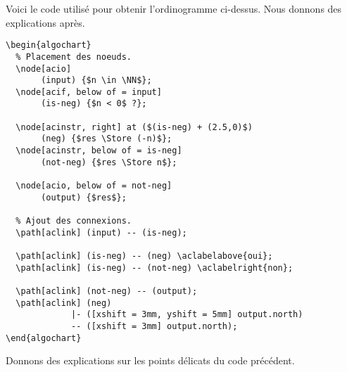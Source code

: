 \documentclass[12pt,a4paper]{article}
\theoremstyle{definition}
\newenvironment{frame-gene}[1][]{
	\begin{tcolorbox}[
		title        = #1, 
		colbacktitle = black!10!white, 
		colback      = white, 
		coltitle     = black,
		fonttitle    = \bfseries\itshape\small, 
		breakable,
		center title]
}{
	\end{tcolorbox}
}
\begin{document}
\begin{center}
    \small
    
\end{center}


Voici le code utilisé pour obtenir l'ordinogramme ci-dessus. Nous donnons des explications après.

\medskip

\begin{frame-gene}
\begin{verbatim}
\begin{algochart}
  % Placement des noeuds.
  \node[acio]
       (input) {$n \in \NN$};
  \node[acif, below of = input]
       (is-neg) {$n < 0$ ?};

  \node[acinstr, right] at ($(is-neg) + (2.5,0)$)
       (neg) {$res \Store (-n)$};
  \node[acinstr, below of = is-neg]
       (not-neg) {$res \Store n$};

  \node[acio, below of = not-neg]
       (output) {$res$};

  % Ajout des connexions.
  \path[aclink] (input) -- (is-neg);

  \path[aclink] (is-neg) -- (neg) \aclabelabove{oui};
  \path[aclink] (is-neg) -- (not-neg) \aclabelright{non};

  \path[aclink] (not-neg) -- (output);
  \path[aclink] (neg)
             |- ([xshift = 3mm, yshift = 5mm] output.north)
             -- ([xshift = 3mm] output.north);
\end{algochart}
\end{verbatim}
\end{frame-gene}


Donnons des explications sur les points délicats du code précédent.
\end{document}
